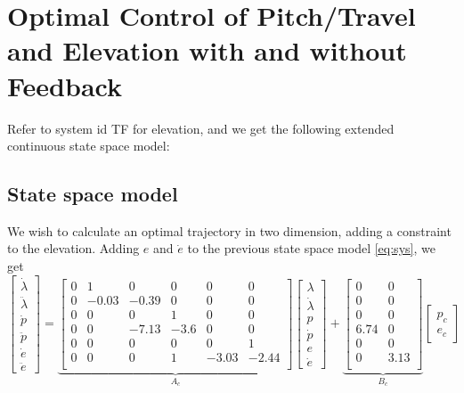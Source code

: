 \section{Optimal Control of Pitch/Travel and Elevation with and without Feedback}\label{sec:prob4}

Refer to system id TF for elevation, and we get the following extended continuous state space model:

\subsection{State space model}
We wish to calculate an optimal trajectory in two dimension, adding a constraint to the elevation. Adding $e$ and $\dot{e}$ to the previous state space model \eqref{eq:sys}, we get
\begin{equation}
	\begin{bmatrix}
		\dot{\lambda}\\
		\ddot{\lambda}	\\
		\dot{p}	\\
		\ddot{p}\\
		\dot{e}	\\
		\ddot{e}
	\end{bmatrix} = 
	\underbrace{
	\begin{bmatrix}
		0 & 1 & 0 & 0 & 0  & 0 \\
		0 & -0.03 & -0.39 & 0 & 0 & 0 \\
		0 & 0 & 0 & 1 & 0 & 0 \\
		0 & 0 & -7.13 & -3.6 & 0 & 0 \\
		0 & 0 & 0 & 0 & 0 & 1 \\
		0 & 0 & 0 & 1 & -3.03 & -2.44 \\
	\end{bmatrix}}_{A_c}
	\begin{bmatrix}
		\lambda	\\
		\dot{\lambda}\\
		p		\\
		\dot{p} \\
		e		\\
		\dot{e}
	\end{bmatrix} +
	\underbrace{
	\begin{bmatrix}
		0 & 0\\
		0 & 0\\
		0 & 0\\
		6.74 & 0\\
		0 & 0 \\
		0 & 3.13 \\
	\end{bmatrix}}_{B_c}
	\begin{bmatrix}
	p_c \\
	e_c
	\end{bmatrix}
	\label{eq:ex_sys}
\end{equation}

